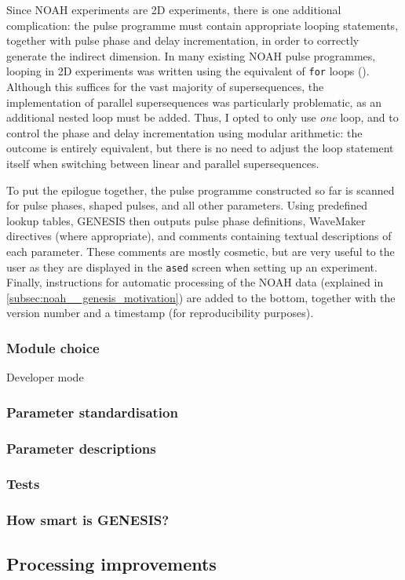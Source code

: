 Since NOAH experiments are 2D experiments, there is one additional complication: the pulse programme must contain appropriate looping statements, together with pulse phase and delay incrementation, in order to correctly generate the indirect dimension.
In many existing NOAH pulse programmes, looping in 2D experiments was written using the equivalent of \texttt{for} loops ().
Although this suffices for the vast majority of supersequences, the implementation of parallel supersequences was particularly problematic, as an additional nested loop must be added.
Thus, I opted to only use \textit{one} loop, and to control the phase and delay incrementation using modular arithmetic: the outcome is entirely equivalent, but there is no need to adjust the loop statement itself when switching between linear and parallel supersequences.


To put the epilogue together, the pulse programme constructed so far is scanned for pulse phases, shaped pulses, and all other parameters.
Using predefined lookup tables, GENESIS then outputs pulse phase definitions, WaveMaker directives (where appropriate), and comments containing textual descriptions of each parameter.
These comments are mostly cosmetic, but are very useful to the user as they are displayed in the \texttt{ased} screen when setting up an experiment.
Finally, instructions for automatic processing of the NOAH data (explained in \cref{subsec:noah__genesis_motivation}) are added to the bottom, together with the version number and a timestamp (for reproducibility purposes).

\subsubsection{Module choice}

Developer mode

\subsubsection{Parameter standardisation}
\subsubsection{Parameter descriptions}
\subsubsection{Tests}
\subsubsection{How smart is GENESIS?}



\subsection{Processing improvements}
\label{subsec:noah__genesis_processing}
